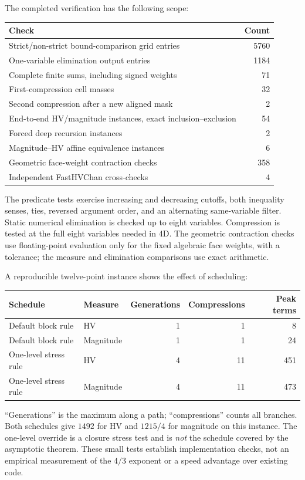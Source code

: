 \documentclass[12pt,a4paper]{article}
\theoremstyle{remark}
\newcommand{\1}{\mathbf1}
\begin{document}
The completed verification has the following scope:
\begin{center}\small
\begin{tabular}{@{}p{.72\linewidth}r@{}}
\toprule
Check&Count\\\midrule
Strict/non-strict bound-comparison grid entries&5760\\
One-variable elimination output entries&1184\\
Complete finite sums, including signed weights&71\\
First-compression cell masses&32\\
Second compression after a new aligned mask&2\\
End-to-end HV/magnitude instances, exact inclusion--exclusion&54\\
Forced deep recursion instances&2\\
Magnitude--HV affine equivalence instances&6\\
Geometric face-weight contraction checks&358\\
Independent FastHVChan cross-checks&4\\\bottomrule
\end{tabular}
\end{center}
The predicate tests exercise increasing and decreasing cutoffs, both
inequality senses, ties, reversed argument order, and an alternating
same-variable filter. Static numerical elimination is checked up to eight
variables. Compression is tested at the full eight variables needed in 4D.
The geometric contraction checks use floating-point evaluation only for
the fixed algebraic face weights, with a tolerance; the measure and
elimination comparisons use exact arithmetic.

A reproducible twelve-point instance shows the effect of scheduling:
\begin{center}\small
\begin{tabular}{@{}llrrr@{}}
\toprule
Schedule&Measure&Generations&Compressions&Peak terms\\\midrule
Default block rule&HV&1&1&8\\
Default block rule&Magnitude&1&1&24\\
One-level stress rule&HV&4&11&451\\
One-level stress rule&Magnitude&4&11&473\\\bottomrule
\end{tabular}
\end{center}
``Generations'' is the maximum along a path; ``compressions'' counts all
branches. Both schedules give $1492$ for HV and $1215/4$ for magnitude
on this instance. The one-level override is a closure stress test and is
\emph{not} the schedule covered by the asymptotic theorem.
These small tests establish implementation checks, not an empirical
measurement of the $4/3$ exponent or a speed advantage over existing code.
\end{document}
